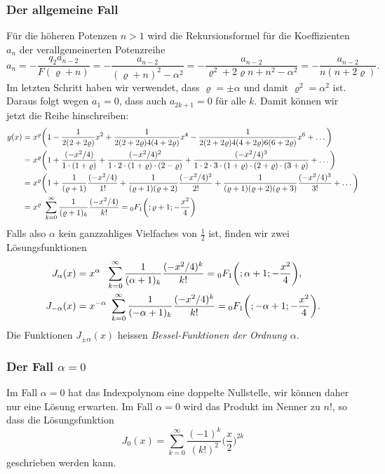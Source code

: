 \subsubsection{Der allgemeine Fall}
Für die höheren Potenzen $n>1$ wird die Rekursionsformel für die
Koeffizienten $a_n$ der verallgemeinerten Potenzreihe
\[
a_{n} =
-\frac{ q_2 a_{n-2} }{F(\varrho+n)}
=
-\frac{a_{n-2}}{(\varrho+n)^2-\alpha^2}
=
-\frac{a_{n-2}}{\varrho^2 + 2\varrho n+n^2-\alpha^2}
=
-\frac{a_{n-2}}{n(n+2\varrho)}.
\]
Im letzten Schritt haben wir verwendet, dass $\varrho=\pm\alpha$
und damit $\varrho^2=\alpha^2$ ist.
Daraus folgt wegen $a_1=0$, dass auch $a_{2k+1}=0$ für alle $k$.
Damit können wir jetzt die Reihe hinschreiben:
\begin{align*}
y(x)
&=
x^{\varrho}\biggl(
1
-
\frac{1}{2(2+2\varrho)} x^2
+
\frac{1}{2(2+2\varrho)4(4+2\varrho)} x^4
-
\frac{1}{2(2+2\varrho)4(4+2\varrho)6(6+2\varrho)} x^6
+
\dots
\biggr)
\\
&=
x^{\varrho}
\biggl(
1
+
\frac{(-x^2/4)}{1\cdot (1+\varrho)}
+
\frac{(-x^2/4)^2}{1\cdot 2\cdot (1+\varrho)\cdot(2-\varrho)}
+
\frac{(-x^2/4)^3}{1\cdot 2\cdot 3\cdot (1+\varrho)\cdot(2+\varrho)\cdot(3+\varrho)}
+
\dots
\biggr)
\\
&=
x^\varrho\biggl(
1
+
\frac{1}{(\varrho+1)}\frac{(-x^2/4)}{1!}
+
\frac{1}{(\varrho+1)(\varrho+2)}\frac{(-x^2/4)^2}{2!}
+
\frac{1}{(\varrho+1)(\varrho+2)(\varrho+3)}\frac{(-x^2/4)^3}{3!}
+
\dots
\biggr)
\\
&=
x^\varrho \sum_{k=0}^\infty
\frac{1}{(\varrho+1)_k} \frac{(-x^2/4)}{k!}
=
\mathstrut_0F_1\biggl(;\varrho+1;-\frac{x^2}{4}\biggr)
\end{align*}
Falls also $\alpha$ kein ganzzahliges Vielfaches von $\frac12$ ist, finden
wir zwei Lösungsfunktionen
\begin{align}
J_\alpha(x)
&=
x^{\alpha\phantom{-}}
\sum_{k=0}^\infty
\frac{1}{(\alpha+1)_k}
\frac{(-x^2/4)^k}{k!}
=
\mathstrut_0F_1\biggl(;\alpha+1;-\frac{x^2}{4}\biggr),
\label{buch:differentialgleichunge:bessel:erste}
\\
J_{-\alpha}(x)
&=
x^{-\alpha} \sum_{k=0}^\infty
\frac{1}{(-\alpha+1)_k} \frac{(-x^2/4)^k}{k!}
=
\mathstrut_0F_1\biggl(;-\alpha+1;-\frac{x^2}{4}\biggr).
\label{buch:differentialgleichunge:bessel:zweite}
\end{align}
Die Funktionen $J_{\pm\alpha}(x)$ heissen {\em Bessel-Funktionen
der Ordnung $\alpha$}.

\subsubsection{Der Fall $\alpha=0$}
Im Fall $\alpha=0$ hat das Indexpolynom eine doppelte Nullstelle, wir
können daher nur eine Lösung erwarten.
Im Fall $\alpha=0$ wird das Produkt im Nenner zu $n!$, so dass die
Lösungsfunktion
\[
J_0(x)
=
\sum_{k=0}^\infty
\frac{(-1)^k}{(k!)^2}
\biggl(\frac{x}{2}\biggr)^{2k}
\]
geschrieben werden kann.


